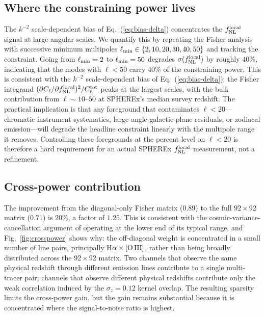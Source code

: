 \documentclass[twocolumn,prd,nofootinbib,superscriptaddress,floatfix,11pt]{revtex4-2}
\begin{document}
\subsection{Where the constraining power lives}
\label{sec:results:ellmin}

The $k^{-2}$ scale-dependent bias of Eq.~(\ref{eq:bias-delta}) concentrates the $f_{\rm NL}^{\rm local}$ signal at large angular scales.  We quantify this by repeating the Fisher analysis with successive minimum multipoles $\ell_{\rm min} \in \{2,10,20,30,40,50\}$ and tracking the constraint.  Going from $\ell_{\rm min}=2$ to $\ell_{\rm min}=50$ degrades $\sigma(f_{\rm NL}^{\rm local})$ by roughly $40\%$, indicating that the modes with $\ell < 50$ carry $40\%$ of the constraining power.  This is consistent with the $k^{-2}$ scale-dependent bias of Eq.~(\ref{eq:bias-delta}): the Fisher integrand $(\partial C_\ell / \partial f_{\rm NL}^{\rm local})^2 / C_\ell^{\rm tot}$ peaks at the largest scales, with the bulk contribution from $\ell \sim 10$--$50$ at SPHEREx's median survey redshift.  The practical implication is that any foreground that contaminates $\ell < 20$---chromatic instrument systematics, large-angle galactic-plane residuals, or zodiacal emission---will degrade the headline constraint linearly with the multipole range it removes.  Controlling these foregrounds at the percent level on $\ell < 20$ is therefore a hard requirement for an actual SPHEREx $f_{\rm NL}^{\rm local}$ measurement, not a refinement.

\subsection{Cross-power contribution}
\label{sec:results:crosspower}

The improvement from the diagonal-only Fisher matrix ($0.89$) to the full $92\times 92$ matrix ($0.71$) is $20\%$, a factor of $1.25$.  This is consistent with the cosmic-variance-cancellation argument of \citet{Seljak2009} operating at the lower end of its typical range, and Fig.~\ref{fig:crosspower} shows why: the off-diagonal weight is concentrated in a small number of line pairs, principally H$\alpha\times{\rm[O\,III]}$, rather than being broadly distributed across the $92 \times 92$ matrix.  Two channels that observe the same physical redshift through different emission lines contribute to a single multi-tracer pair; channels that observe different physical redshifts contribute only the weak correlation induced by the $\sigma_z = 0.12$ kernel overlap.  The resulting sparsity limits the cross-power gain, but the gain remains substantial because it is concentrated where the signal-to-noise ratio is highest.
\end{document}
